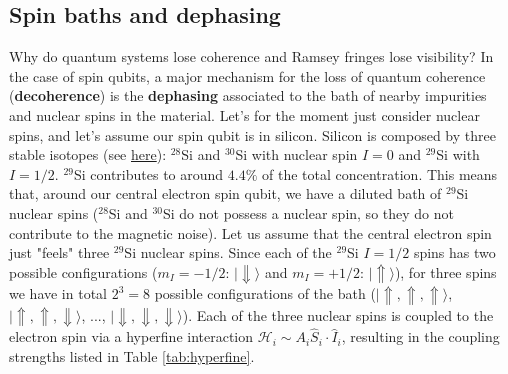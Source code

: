\documentclass[a4paper,11pt]{article}
\newcommand{\ket}[1]{| #1 \rangle}
\begin{document}
\subsection {Spin baths and dephasing}
Why do quantum systems lose coherence and Ramsey fringes lose visibility? In the case of spin qubits, a major mechanism for the loss of quantum coherence ({\bf decoherence}) is the {\bf dephasing} associated to the bath of nearby impurities and nuclear spins in the material.
\newline Let's for the moment just consider nuclear spins, and let's assume our spin qubit is in silicon. Silicon is composed by three stable isotopes (see \href{https://en.wikipedia.org/wiki/Isotopes_of_silicon}{here}): $^{28}$Si and $^{30}$Si with nuclear spin $I=0$ and $^{29}$Si with $I=1/2$. $^{29}$Si contributes to around $4.4\%$ of the total concentration. This means that, around our central electron spin qubit, we have a diluted bath of $^{29}$Si nuclear spins ($^{28}$Si and $^{30}$Si do not possess a nuclear spin, so they do not contribute to the magnetic noise).
\newline Let us assume that the central electron spin just "feels" three $^{29}$Si nuclear spins. Since each of the $^{29}$Si $I=1/2$ spins has two possible configurations ($m_I=-1/2$: $\ket{\Downarrow}$ and $m_I=+1/2$: $\ket{\Uparrow}$), for three spins we have in total $2^3=8$ possible configurations of the bath ($\ket{\Uparrow, \Uparrow, \Uparrow}$, $\ket{\Uparrow, \Uparrow, \Downarrow}$, ..., $\ket{\Downarrow, \Downarrow, \Downarrow}$). Each of the three nuclear spins is coupled to the electron spin via a hyperfine interaction $\mathcal{H}_i \sim A_i \hat{S}_i \cdot \hat {I}_i$, resulting in the coupling strengths listed in Table \ref{tab:hyperfine}. 
\end{document}
